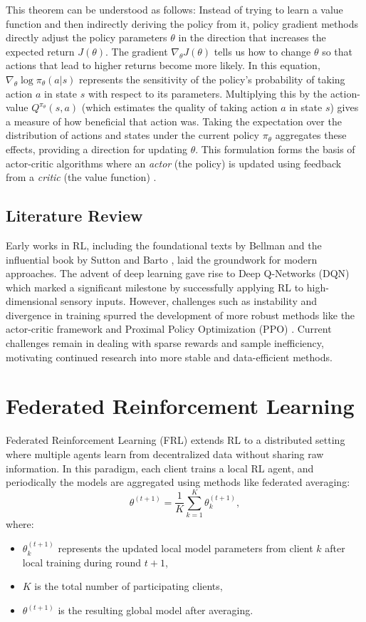 \documentclass[12pt,a4paper,twoside,openany]{book}
\begin{document}
This theorem can be understood as follows: Instead of trying to learn a value function and then indirectly deriving the policy from it, policy gradient methods directly adjust the policy parameters \(\theta\) in the direction that increases the expected return \(J(\theta)\). The gradient \(\nabla_{\theta} J(\theta)\) tells us how to change \(\theta\) so that actions that lead to higher returns become more likely. In this equation, \(\nabla_{\theta} \log \pi_{\theta}(a|s)\) represents the sensitivity of the policy's probability of taking action \(a\) in state \(s\) with respect to its parameters. Multiplying this by the action-value \(Q^{\pi_{\theta}}(s,a)\) (which estimates the quality of taking action \(a\) in state \(s\)) gives a measure of how beneficial that action was. Taking the expectation over the distribution of actions and states under the current policy \(\pi_{\theta}\) aggregates these effects, providing a direction for updating \(\theta\). This formulation forms the basis of actor-critic algorithms where an \emph{actor} (the policy) is updated using feedback from a \emph{critic} (the value function) \cite{Sutton2000}.

\subsection*{Literature Review}

Early works in RL, including the foundational texts by Bellman \cite{Bellman1957} and the influential book by Sutton and Barto \cite{Sutton2000}, laid the groundwork for modern approaches. The advent of deep learning gave rise to Deep Q-Networks (DQN) \cite{Mnih2015} which marked a significant milestone by successfully applying RL to high-dimensional sensory inputs. However, challenges such as instability and divergence in training spurred the development of more robust methods like the actor-critic framework and Proximal Policy Optimization (PPO) \cite{Schulman2017}. Current challenges remain in dealing with sparse rewards and sample inefficiency, motivating continued research into more stable and data-efficient methods.

\section{Federated Reinforcement Learning}

Federated Reinforcement Learning (FRL) extends RL to a distributed setting where multiple agents learn from decentralized data without sharing raw information. In this paradigm, each client trains a local RL agent, and periodically the models are aggregated using methods like federated averaging:
\[
\theta^{(t+1)} = \frac{1}{K} \sum_{k=1}^{K} \theta^{(t+1)}_k,
\]
where:
\begin{itemize}
    \item \(\theta^{(t+1)}_k\) represents the updated local model parameters from client \(k\) after local training during round \(t+1\),
    \item \(K\) is the total number of participating clients,
    \item \(\theta^{(t+1)}\) is the resulting global model after averaging.
\end{itemize}
\end{document}

